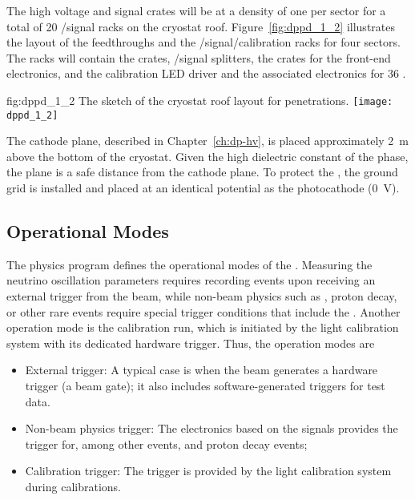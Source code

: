 The high voltage and signal crates will be at a density of one per sector for a total of \num{20} /signal racks on the cryostat roof. Figure~\ref{fig:dppd_1_2} illustrates the layout of the feedthroughs and the /signal/calibration racks for four sectors. The racks will contain the  crates, /signal splitters, the  crates for the front-end electronics, and the calibration LED driver and the associated electronics for \num{36} .

\begin{dunefigure}{fig:dppd_1_2}
{The sketch of the cryostat roof layout for \dual {} penetrations.}
\texttt{[image: dppd\_1\_2]}
\end{dunefigure}

The cathode plane, described in Chapter~\ref{ch:dp-hv}, is placed approximately \SI{2}{m} above the bottom of the cryostat. Given the high dielectric constant of the \lar phase, the  plane is a safe distance from the cathode plane. To protect the , the ground grid is installed and placed at an identical potential as the  photocathode (\SI{0}{V}).

\subsection{Operational Modes} %
\label{sec:dp-pds-oveerview_operation}

The physics program defines the operational modes of the \dual {}. Measuring the neutrino oscillation parameters requires recording events upon receiving an external trigger from the beam, while non-beam physics such as , proton decay, or other rare events require special trigger conditions that include the . Another operation mode is the  calibration run, which is initiated by the light calibration system with its dedicated hardware trigger.
%
Thus, the operation modes are
\begin{itemize}
\item External trigger: %
A typical case is when the beam generates a hardware trigger (a beam gate);  it also includes software-generated triggers for test data.
\item Non-beam physics trigger: The electronics based on the  signals provides the trigger for, among other events,  and proton decay events;
\item Calibration trigger: The trigger is provided by the light calibration system during  calibrations.
\end{itemize}


